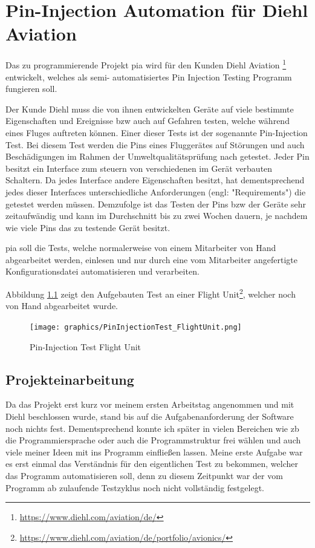 \chapter{Pin-Injection Automation für Diehl Aviation}
\label{ch:pia}

Das zu programmierende Projekt \ac{pia} wird für den Kunden Diehl Aviation
\footnote{\url{https://www.diehl.com/aviation/de/}} entwickelt, welches als semi-
automatisiertes Pin Injection Testing Programm fungieren soll.

Der Kunde Diehl muss die von ihnen entwickelten Geräte auf viele bestimmte Eigenschaften und
Ereignisse \ac{bzw} auch auf Gefahren testen, welche während eines Fluges auftreten können.
Einer dieser Tests ist der sogenannte Pin-Injection Test.
Bei diesem Test werden die Pins eines Fluggerätes auf Störungen und auch Beschädigungen im
Rahmen der Umweltqualitätsprüfung nach \cite{DO-160} getestet. Jeder Pin besitzt ein Interface
zum steuern von verschiedenen im Gerät verbauten Schaltern. Da jedes Interface andere
Eigenschaften besitzt, hat dementsprechend jedes dieser Interfaces unterschiedliche
Anforderungen (engl: "Requirements") die getestet werden müssen.
Demzufolge ist das Testen der Pins \ac{bzw} der Geräte sehr zeitaufwändig und kann im
Durchschnitt bis zu zwei Wochen dauern, je nachdem wie viele Pins das zu testende Gerät
besitzt.

\ac{pia} soll die Tests, welche normalerweise von einem Mitarbeiter von Hand abgearbeitet
werden, einlesen und nur durch eine vom Mitarbeiter angefertigte Konfigurationsdatei
automatisieren und verarbeiten.

\pagebreak
Abbildung \ref{fig:flight_unit} zeigt den Aufgebauten Test an einer Flight Unit\footnote{\url{https://www.diehl.com/aviation/de/portfolio/avionics/}}, welcher noch von Hand abgearbeitet wurde.

\begin{figure}[H]
	\centering
	\texttt{[image: graphics/PinInjectionTest\_FlightUnit.png]}
	\caption{Pin-Injection Test Flight Unit}
	\label{fig:flight_unit}
\end{figure}


\section{Projekteinarbeitung}
\label{sec:prj-einarbeitung}

Da das Projekt erst kurz vor meinem ersten Arbeitstag angenommen und mit Diehl beschlossen
wurde, stand bis auf die Aufgabenanforderung der Software noch nichts fest. Dementsprechend
konnte ich später in vielen Bereichen wie \ac{zb} die Programmiersprache oder auch die
Programmstruktur frei wählen und auch viele meiner Ideen mit ins Programm einfließen lassen.
Meine erste Aufgabe war es erst einmal das Verständnis für den eigentlichen Test zu bekommen,
welcher das Programm automatisieren soll, denn zu diesem Zeitpunkt war der vom Programm
ab zulaufende Testzyklus noch nicht vollständig festgelegt. 


